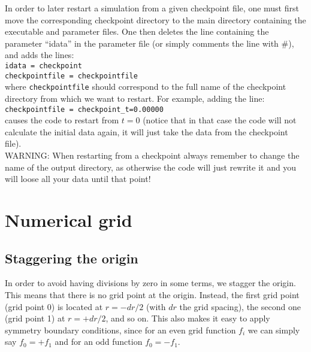 \documentclass[12pt]{article}
\begin{document}
In order to later restart a simulation from a given checkpoint file,
one must first move the corresponding checkpoint directory to the main
directory containing the executable and parameter files.  One then
deletes the line containing the parameter ``idata'' in the parameter
file (or simply comments the line with \#), and adds the lines: \\

\texttt{idata = checkpoint} \\
\texttt{checkpointfile = checkpointfile} \\

\noindent where \texttt{checkpointfile} should correspond to the full
name of the checkpoint directory from which we want to restart. For
example, adding the line: \\

\texttt{checkpointfile = checkpoint\_t=0.00000} \\

causes the code to restart from $t=0$ (notice that in that case the code
will not calculate the initial data again, it will just take the data
from the checkpoint file). \\

WARNING: When restarting from a checkpoint always remember to change
the name of the output directory, as otherwise the code will just
rewrite it and you will loose all your data until that point!



\setcounter{equation}{0}
\section{Numerical grid}
\label{sec:grid}

\subsection{Staggering the origin}

In order to avoid having divisions by zero in some terms, we stagger
the origin.  This means that there is no grid point at the origin.
Instead, the first grid point (grid point 0) is located at $r=-dr/2$
(with $dr$ the grid spacing), the second one (grid point 1) at
$r=+dr/2$, and so on.  This also makes it easy to apply symmetry
boundary conditions, since for an even grid function $f_i$ we can
simply say $f_0=+f_1$ and for an odd function $f_0=-f_1$. \\
\end{document}
